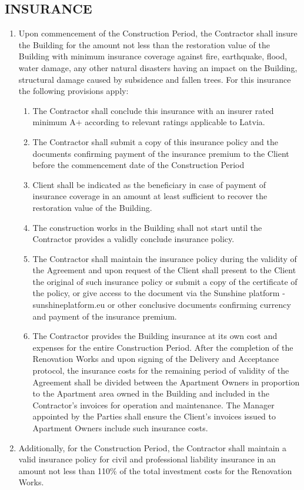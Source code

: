 \begin{multicols}{2}
\subsection{INSURANCE}
\begin{enumerate}
	\item	Upon commencement of the Construction Period, the Contractor shall insure the Building for the amount not less than the restoration value of the Building with minimum insurance coverage against fire, earthquake, flood, water damage, any other natural disasters having an impact on the Building, structural damage caused by subsidence and fallen trees. For this insurance the following provisions apply:
	\begin{enumerate}
		\item	The Contractor shall conclude this insurance with an insurer rated minimum A+ according to relevant ratings applicable to Latvia.
		\item	The Contractor shall submit a copy of this insurance policy and the documents confirming payment of the insurance premium to the Client before the commencement date of the Construction Period
		\item	Client shall be indicated as the beneficiary in case of payment of insurance coverage in an amount at least sufficient to recover the restoration value of the Building.
		\item	The construction works in the Building shall not start until the Contractor provides a validly conclude insurance policy.
		\item	The Contractor shall maintain the insurance policy during the validity of the Agreement and upon request of the Client shall present to the Client the original of such insurance policy or submit a copy of the certificate of the policy, or give access to the document via the Sunshine platform - sunshineplatform.eu or other conclusive documents confirming currency and payment of the insurance premium.
		\item	The Contractor provides the Building insurance at its own cost and expenses for the entire Construction Period. After the completion of the Renovation Works and upon signing of the Delivery and Acceptance protocol, the insurance costs for the remaining period of validity of the Agreement shall be divided between the Apartment Owners in proportion to the Apartment area owned in the Building and included in the Contractor’s invoices for operation and maintenance. The Manager appointed by the Parties shall ensure the Client’s invoices issued to Apartment Owners include such insurance costs.
	\end{enumerate}
	\item	Additionally, for the Construction Period, the Contractor shall maintain a valid insurance policy for civil and professional liability insurance in an amount not less than 110\% of the total investment costs for the Renovation Works.
\end{enumerate}


\end{multicols}
